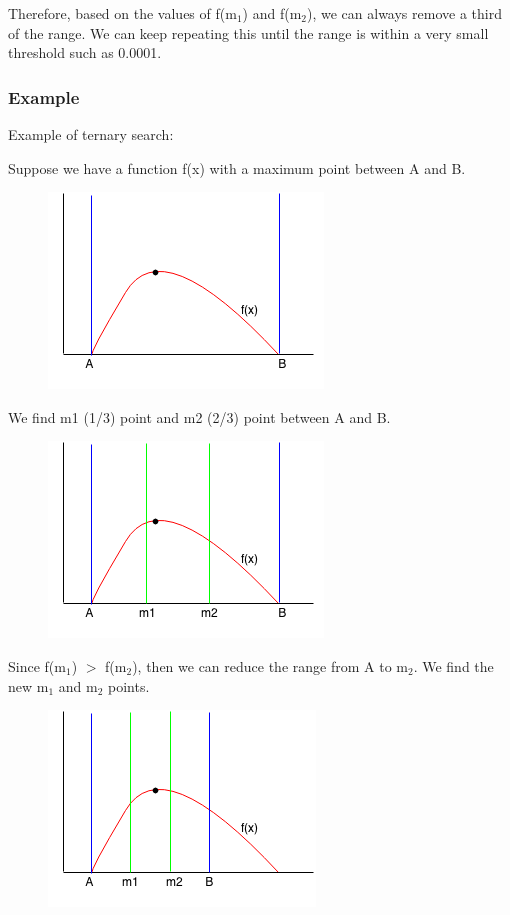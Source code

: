 \documentclass[11pt,oneside]{book}
\makeatletter
\def\maxwidth#1{\ifdim\Gin@nat@width>#1 #1\else\Gin@nat@width\fi}
\makeatother
\begin{document}
Therefore, based on the values of f(m$_{1}$) and f(m$_{2}$), we can always remove a third of the range. We can keep repeating this until the range is within a very small threshold such as 0.0001.

\subsubsection{Example}

Example of ternary search:

Suppose we have a function f(x) with a maximum point between A and B.

\vspace{5px}\begin{figure}[H]\centering
        \includegraphics[width=0.66\maxwidth{\textwidth}]{ternarysearch.png}
        \end{figure}

We find m1 (1/3) point and m2 (2/3) point between A and B.

\vspace{5px}\begin{figure}[H]\centering
        \includegraphics[width=0.66\maxwidth{\textwidth}]{ternarysearch2.png}
        \end{figure}

Since f(m$_{1}$) $>$ f(m$_{2}$), then we can reduce the range from A to m$_{2}$. We find the new m$_{1}$ and m$_{2}$ points.

\vspace{5px}\begin{figure}[H]\centering
        \includegraphics[width=0.66\maxwidth{\textwidth}]{ternarysearch3.png}
        \end{figure}
\end{document}
